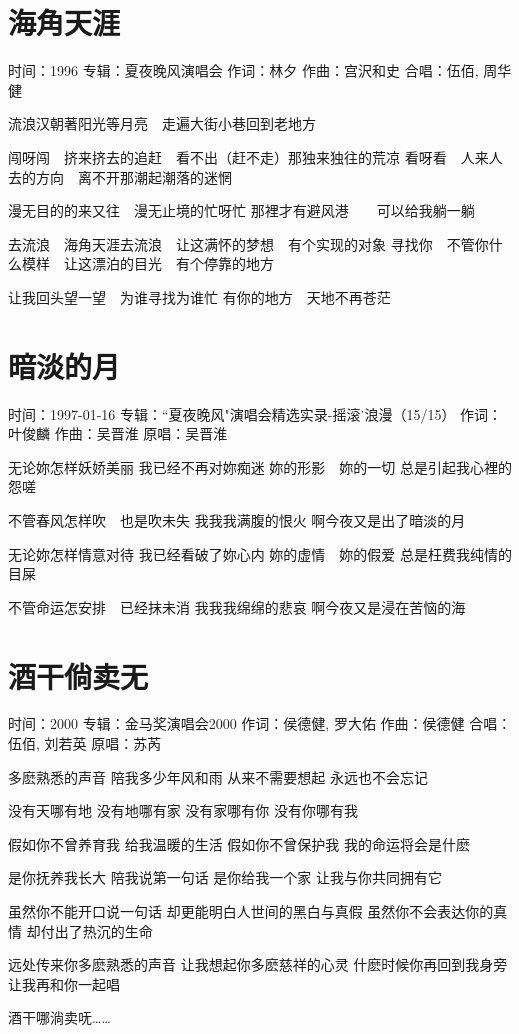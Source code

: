 \documentclass[UTF8,a4paper,oneside,twocolumn,12pt]{ctexbook}
\newcommand{\infopair}[2]{\textbullet #1：#2}
\newcommand{\zc}[1][伍佰]{\infopair{作词}{#1}}
\newcommand{\zq}[1][伍佰]{\infopair{作曲}{#1}}
\newcommand{\zj}[1]{\infopair{专辑}{#1}}
\newcommand{\yc}[1]{\infopair{原唱}{#1}}
\newcommand{\sj}[1]{\infopair{时间}{#1}}
\newenvironment{info}{\begin{flushleft}\kaishu
	}
	{\end{flushleft}\normalsize\yahei\par}
\newenvironment{lyric}{
	}
{}
\begin{document}
\section{海角天涯}
\begin{info}
	\sj{1996}
	\zj{夏夜晚风演唱会}
	\zc[林夕]
	\zq[宫沢和史]
	\infopair{合唱}{伍佰, 周华健}
\end{info}
\begin{lyric}
	流浪汉朝著阳光等月亮　走遍大街小巷回到老地方

	闯呀闯　挤来挤去的追赶　看不出（赶不走）那独来独往的荒凉
	看呀看　人来人去的方向　离不开那潮起潮落的迷惘

	漫无目的的来又往　漫无止境的忙呀忙
	那裡才有避风港　　可以给我躺一躺

	去流浪　海角天涯去流浪　让这满怀的梦想　有个实现的对象
	寻找你　不管你什么模样　让这漂泊的目光　有个停靠的地方

	让我回头望一望　为谁寻找为谁忙
	有你的地方　天地不再苍茫
\end{lyric}

\section{暗淡的月}
\begin{info}
	\sj{1997-01-16}
	\zj{``夏夜晚风"演唱会精选实录-摇滚˙浪漫（15/15）}
	\zc[叶俊麟]
	\zq[吴晋淮]
	\yc{吴晋淮}
\end{info}
\begin{lyric}
	无论妳怎样妖娇美丽
	我已经不再对妳痴迷
	妳的形影　妳的一切
	总是引起我心裡的怨嗟

	不管春风怎样吹　也是吹未失
	我我我满腹的恨火
	啊今夜又是出了暗淡的月

	无论妳怎样情意对待
	我已经看破了妳心内
	妳的虚情　妳的假爱
	总是枉费我纯情的目屎

	不管命运怎安排　已经抹未消
	我我我绵绵的悲哀
	啊今夜又是浸在苦恼的海
\end{lyric}

\section{酒干倘卖无}
\begin{info}
	\sj{2000}
	\zj{金马奖演唱会2000}
	\zc[侯德健, 罗大佑]
	\zq[侯德健]
	\infopair{合唱}{伍佰, 刘若英}
	\yc{苏芮}
\end{info}
\begin{lyric}
	多麽熟悉的声音
	陪我多少年风和雨
	从来不需要想起
	永远也不会忘记

	没有天哪有地
	没有地哪有家
	没有家哪有你
	没有你哪有我

	假如你不曾养育我
	给我温暖的生活
	假如你不曾保护我
	我的命运将会是什麽

	是你抚养我长大
	陪我说第一句话
	是你给我一个家
	让我与你共同拥有它

	虽然你不能开口说一句话
	却更能明白人世间的黑白与真假
	虽然你不会表达你的真情
	却付出了热沉的生命

	远处传来你多麽熟悉的声音
	让我想起你多麽慈祥的心灵
	什麽时候你再回到我身旁
	让我再和你一起唱

	酒干哪淌卖呒……
\end{lyric}
\end{document}
